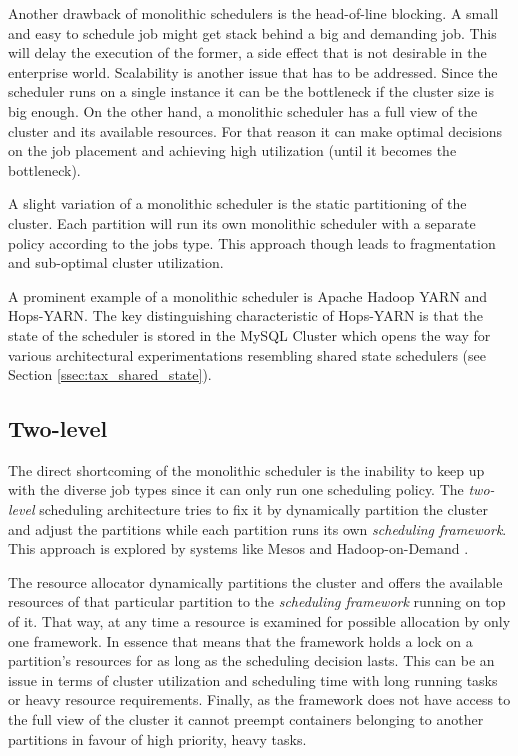 Another drawback of monolithic schedulers is the head-of-line
blocking. A small and easy to schedule job might get stack behind a
big and demanding job. This will delay the execution of the former, a
side effect that is not desirable in the enterprise world. Scalability
is another issue that has to be addressed. Since the scheduler runs on
a single instance it can be the bottleneck if the cluster size is big
enough. On the other hand, a monolithic scheduler has a full view of the
cluster and its available resources. For that reason it can make
optimal decisions on the job placement and achieving high utilization
(until it becomes the bottleneck).

A slight variation of a monolithic scheduler is the static
partitioning of the cluster. Each partition will run its own
monolithic scheduler with a separate policy according to the jobs
type. This approach though leads to fragmentation and sub-optimal
cluster utilization.

A prominent example of a monolithic scheduler is Apache Hadoop YARN
and Hops-YARN. The key distinguishing characteristic of Hops-YARN is that the state of the
scheduler is stored in the MySQL Cluster which opens the way for
various architectural experimentations resembling shared state schedulers (see
Section \ref{ssec:tax_shared_state}).

\subsection{Two-level}
\label{ssec:tax_two_level}
The direct shortcoming of the monolithic scheduler is the inability to
keep up with the diverse job types since it can only run one
scheduling policy. The \emph{two-level} scheduling architecture tries
to fix it by dynamically partition the cluster and adjust the
partitions while each partition runs its own \emph{scheduling framework}. This approach
is explored by systems like Mesos \cite{Hindman:2011:MPF:1972457.1972488}
and Hadoop-on-Demand \cite{hadoop_hod}.

The resource allocator dynamically partitions the cluster and offers
the available resources of that particular partition to
the \emph{scheduling framework} running on top of it. That way, at any
time a resource is examined for possible allocation by only one
framework. In essence that means that the framework holds a lock on a
partition's resources for as long as the scheduling decision lasts. This
can be an issue in terms of cluster utilization and scheduling time
with long running tasks or heavy resource requirements. Finally, as
the framework does not have access to the full view of the cluster it
cannot preempt containers belonging to another partitions in favour of
high priority, heavy tasks.

